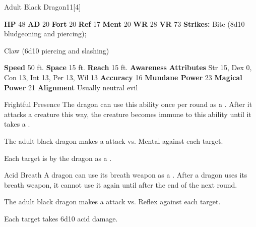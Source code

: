   \begin{monsubsection}{Adult Black Dragon}{11}[4]
    \vspace{-1em}\vspace{-1em}
    \vspace{0em}

    
    

    \begin{spellcontent}
      \begin{spelltargetinginfo}
        \pari \textbf{HP} 48 \monsep
          \textbf{AD} 20 \monsep
          \textbf{Fort} 20 \monsep
          \textbf{Ref} 17 \monsep
          \textbf{Ment} 20
        \pari \textbf{WR} 28 \monsep
        \textbf{VR} 73
        \pari \textbf{Strikes:}
            Bite  (8d10 bludgeoning and piercing);
\par Claw  (6d10 piercing and slashing)
      \end{spelltargetinginfo}
    \end{spellcontent}
    \begin{monsterfooter}
      \pari \textbf{Speed} 50 ft. \monsep
        \textbf{Space} 15 ft. \monsep
        \textbf{Reach} 15 ft.
      \pari \textbf{Awareness} 
      \pari \textbf{Attributes}
        Str 15, Dex 0,
        Con 13, Int 13,
        Per 13, Wil 13
      \pari \textbf{Accuracy} 16 \monsep
        \textbf{Mundane Power} 23 \monsep
      \textbf{Magical Power} 21
      \pari \textbf{Alignment} Usually neutral evil
    \end{monsterfooter}
  \end{monsubsection}
  \begin{freeability}{Frightful Presence}
      The dragon can use this ability once per round as a .
      After it attacks a creature this way, the creature becomes immune to this ability until it takes a .
      \par The adult black dragon makes a  attack
        vs. Mental against each target.
    
    \hit Each target is  by the dragon as a .
    \end{freeability}
  

    \begin{freeability}{Acid Breath}
      A dragon can use its breath weapon as a .
      After a dragon uses its breath weapon, it cannot use it again until after the end of the next round.
      \par The adult black dragon makes a  attack
        vs. Reflex against each target.
    
    \hit Each target takes 6d10 acid damage.
    \end{freeability}
  
